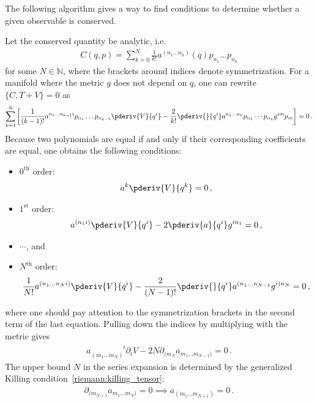     The following algorithm gives a way to find conditions to determine whether a given observable is conserved.
    \begin{method}
        Let the conserved quantity be analytic, i.e.
        \begin{gather}
            C(q,p) = \sum_{k=0}^N\frac{1}{k!}a^{(n_1\ldots n_k)}(q)p_{n_1}\ldots p_{n_k}
        \end{gather}
        for some $N\in\mathbb{N}$, where the brackets around indices denote symmetrization. For a manifold where the metric $g$ does not depend on $q$, one can rewrite $\{C,T+V\} = 0$ as
        \begin{gather}
            \sum_{k=1}^N\left[\frac{1}{(k-1)!}a^{n_1\ldots n_{k-1}i}p_{n_1}\ldots p_{n_{k-1}}\pderiv{V}{q^i} - \frac{2}{k!}\pderiv{}{q^i}a^{n_1\ldots n_k}p_{n_1}\cdots p_{n_k}g^{im}p_m\right] = 0\,.
        \end{gather}
        Because two polynomials are equal if and only if their corresponding coefficients are equal, one obtains the following conditions:
        \begin{itemize}
            \item $0^{\text{th}}$ order:
                \begin{gather}
                    a^k\pderiv{V}{q^k} = 0\,,
                \end{gather}
            \item $1^{\text{st}}$ order:
                \begin{gather}
                    a^{(n_1i)}\pderiv{V}{q^i} - 2\pderiv{a}{q^i}g^{in_1} = 0\,,
                \end{gather}
            \item $\cdots$, and
            \item $N^{\text{th}}$ order:
                \begin{gather}
                    \frac{1}{N!}a^{(n_1\ldots n_Ni)}\pderiv{V}{q^i} - \frac{2}{(N-1)!}\pderiv{}{q^i}a^{(n_1\ldots n_{N-1}}g^{i)n_N} = 0\,,
                \end{gather}
        \end{itemize}
        where one should pay attention to the symmetrization brackets in the second term of the last equation. Pulling down the indices by multiplying with the metric gives
        \begin{gather}
            a_{(m_1\ldots m_N)}^{\phantom{(m_1\ldots m_N)}i}\partial_iV - 2N\partial_{(m_N}a_{m_1\ldots m_{N-1})} = 0\,.
        \end{gather}
        The upper bound $N$ in the series expansion is determined by the generalized Killing condition~\eqref{riemann:killing_tensor}:
        \begin{gather}
            \partial_{(m_{N+1}}a_{m_1\ldots m_N)} = 0\implies a_{(m_1\ldots m_{N+1})} = 0\,.
        \end{gather}
    \end{method}
